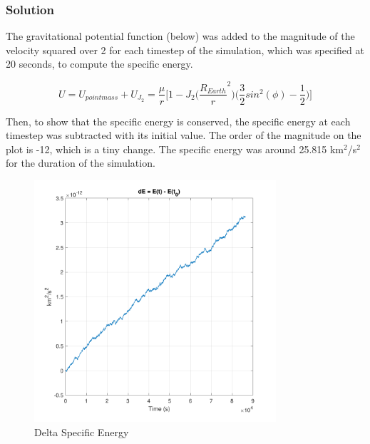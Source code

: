 \documentclass[conf]{new-aiaa}
\begin{document}

\subsubsection*{Solution} 

The gravitational potential function (below) was added to the magnitude of the velocity squared over 2 for each timestep of the simulation, which was specified at 20 seconds, to compute the specific energy. 

\begin{equation}
	U = U_{point mass} + U_{J_2} = \dfrac{\mu}{r} \Bigg[ 1 - J_2 \Bigg( \dfrac{R_{Earth} }{ r }^2 \Bigg) 
	\Bigg( \dfrac{3}{2} sin^2 ( \phi ) - \dfrac{1}{2} \Bigg) \Bigg]
\end{equation}

Then, to show that the specific energy is conserved, the specific energy at each timestep was subtracted with its initial value. The order of the magnitude on the plot is -12, which is a tiny change. The specific energy was around 25.815 km$^2$/s$^2$ for the duration of the simulation. 


\begin{figure}[H]
	\centering 
	\includegraphics[width=0.8\textwidth]{Problem 1c - Delta Specific Energy.pdf}	
	\caption{Delta Specific Energy} 
	\label{fig:prob_1c}
\end{figure}


\newpage
\end{document}
